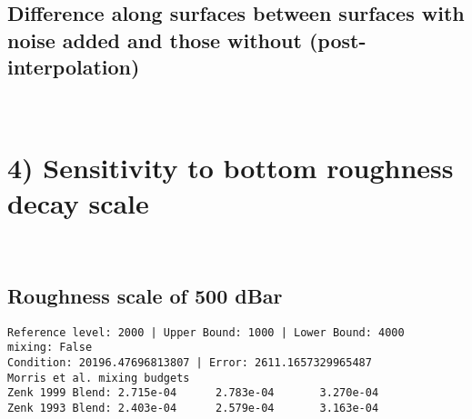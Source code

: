 \documentclass[11pt]{article}
\begin{document}
    \hypertarget{difference-along-surfaces-between-surfaces-with-noise-added-and-those-without-post-interpolation}{%
\subsection{Difference along surfaces between surfaces with noise added
and those without
(post-interpolation)}\label{difference-along-surfaces-between-surfaces-with-noise-added-and-those-without-post-interpolation}}

    \begin{center}
    \end{center}
    { \hspace*{\fill} \\}
    
    \hypertarget{sensitivity-to-bottom-roughness-decay-scale}{%
\section{4) Sensitivity to bottom roughness decay
scale}\label{sensitivity-to-bottom-roughness-decay-scale}}

    \begin{center}
    \end{center}
    { \hspace*{\fill} \\}
    
    \hypertarget{roughness-scale-of-500-dbar}{%
\subsection{Roughness scale of 500
dBar}\label{roughness-scale-of-500-dbar}}

    \begin{Verbatim}[commandchars=\\\{\}]
Reference level: 2000 | Upper Bound: 1000 | Lower Bound: 4000
mixing: False
Condition: 20196.47696813807 | Error: 2611.1657329965487
Morris et al. mixing budgets
Zenk 1999 Blend: 2.715e-04      2.783e-04       3.270e-04
Zenk 1993 Blend: 2.403e-04      2.579e-04       3.163e-04
    \end{Verbatim}

    \begin{center}
    \end{center}
    { \hspace*{\fill} \\}
    
\end{document}
